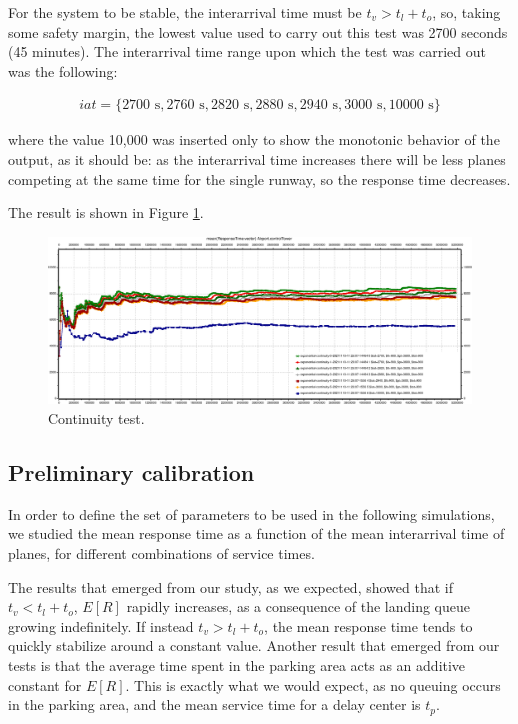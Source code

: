 \documentclass[12pt]{article}
\begin{document}
For the system to be stable, the interarrival time must be $ t_v > t_l + t_o $, so, taking some safety margin, the lowest value used to carry out this test was 2700 seconds (45 minutes).
The interarrival time range upon which the test was carried out was the following: 

\begin{gather*}
    iat = \{2700 \text{ s}, 2760 \text{ s}, 2820 \text{ s}, 2880 \text{ s}, 2940 \text{ s}, 3000 \text{ s}, 10000 \text{ s}\}
\end{gather*} 

where the value 10,000 was inserted only to show the monotonic behavior of the output, as it should be:
as the interarrival time increases there will be less planes competing at the same time for the single runway, so the response time decreases. 

The result is shown in Figure \ref{continuity_test}.

\begin{figure}[H]
	\centering\includegraphics[width=1\textwidth]{immagini/exponential-continuity.eps}
	\caption{Continuity test.}\label{continuity_test}
\end{figure}

\subsection{Preliminary calibration}
\label{preliminary_calibration}

In order to define the set of parameters to be used in the following simulations, we studied the mean response time as a function of the mean interarrival time of planes, for different combinations of service times.

The results that emerged from our study, as we expected, showed that if $t_v < t_l + t_o$, $E[R]$ rapidly increases, as a consequence of the landing queue growing indefinitely. If instead $t_v > t_l + t_o$, the mean response time tends to quickly stabilize around a constant value. Another result that emerged from our tests is that the average time spent in the parking area acts as an additive constant for $E[R]$. This is exactly what we would expect, as no queuing occurs in the parking area, and the mean service time for a delay center is $t_p$.
\end{document}
